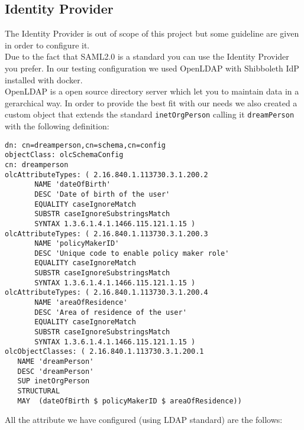 \subsection{Identity Provider}
The Identity Provider is out of scope of this project but some guideline are given in order to configure it.\\
Due to the fact that SAML2.0 is a standard you can use the Identity Provider you prefer. In our testing configuration we used OpenLDAP with Shibboleth IdP installed with docker.\\
OpenLDAP is a open source directory server which let you to maintain data in a gerarchical way. In order to provide the best fit with our needs we also created a custom object that extends the standard \texttt{inetOrgPerson} calling it \texttt{dreamPerson} with the following definition:
\begin{verbatim}
dn: cn=dreamperson,cn=schema,cn=config
objectClass: olcSchemaConfig
cn: dreamperson
olcAttributeTypes: ( 2.16.840.1.113730.3.1.200.2
       NAME 'dateOfBirth'
       DESC 'Date of birth of the user'
       EQUALITY caseIgnoreMatch
       SUBSTR caseIgnoreSubstringsMatch
       SYNTAX 1.3.6.1.4.1.1466.115.121.1.15 )
olcAttributeTypes: ( 2.16.840.1.113730.3.1.200.3
       NAME 'policyMakerID'
       DESC 'Unique code to enable policy maker role'
       EQUALITY caseIgnoreMatch
       SUBSTR caseIgnoreSubstringsMatch
       SYNTAX 1.3.6.1.4.1.1466.115.121.1.15 )
olcAttributeTypes: ( 2.16.840.1.113730.3.1.200.4
       NAME 'areaOfResidence'
       DESC 'Area of residence of the user'
       EQUALITY caseIgnoreMatch
       SUBSTR caseIgnoreSubstringsMatch
       SYNTAX 1.3.6.1.4.1.1466.115.121.1.15 )
olcObjectClasses: ( 2.16.840.1.113730.3.1.200.1
   NAME 'dreamPerson'
   DESC 'dreamPerson'
   SUP inetOrgPerson
   STRUCTURAL
   MAY  (dateOfBirth $ policyMakerID $ areaOfResidence))

\end{verbatim}
All the attribute we have configured (using LDAP standard) are the follows:
